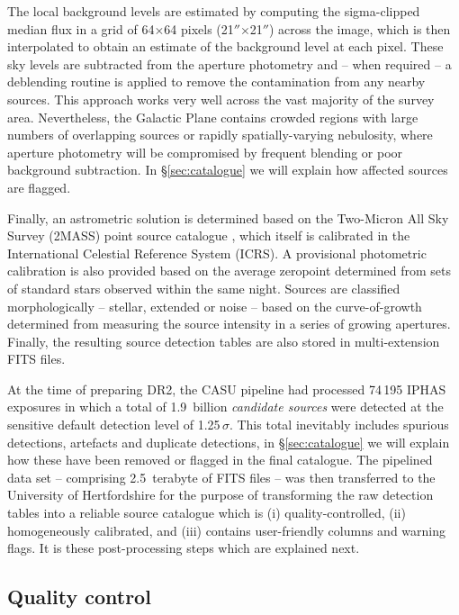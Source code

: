 \documentclass[useAMS,usenatbib]{mn2e}
\def\arcsec{$''$}
\begin{document}
The local background levels are estimated 
by computing the sigma-clipped median
flux in a grid of 64$\times$64 pixels (21\arcsec$\times$21\arcsec)
across the image,
which is then interpolated to obtain an estimate 
of the background level at each pixel.
These sky levels are subtracted from the aperture photometry and
-- when required --
a deblending routine is applied to remove
the contamination from any nearby sources.
This approach works very well 
across the vast majority of the survey area.  Nevertheless,
the Galactic Plane contains crowded regions 
with large numbers of overlapping sources
or rapidly spatially-varying nebulosity,
where aperture photometry will be compromised by frequent blending
or poor background subtraction.
In \S\ref{sec:catalogue} we will explain how affected sources are 
flagged. 

Finally, an astrometric solution is determined
based on the Two-Micron All Sky Survey (2MASS) point source catalogue \citep{Skrutskie2006},
which itself is calibrated 
in the International Celestial Reference System (ICRS).
A provisional photometric calibration is also provided 
based on the average zeropoint
determined from sets of standard stars observed within the same night.
Sources are classified morphologically
-- stellar, extended or noise --
based on the curve-of-growth determined
from measuring the source intensity in a series of growing apertures.
Finally, the resulting source detection tables are also stored 
in multi-extension FITS files.

At the time of preparing DR2,
the CASU pipeline had processed
74\,195 IPHAS exposures 
in which a total of 1.9~billion \emph{candidate sources} were detected 
at the sensitive default detection level of 1.25\,$\sigma$.
This total inevitably includes spurious detections, artefacts and
duplicate detections,
in \S\ref{sec:catalogue} we will explain
how these have been removed or flagged in the final catalogue.
The pipelined data set -- comprising 2.5~terabyte of FITS files --
was then transferred to the University of Hertfordshire
for the purpose of transforming the raw
detection tables into a reliable source catalogue which is 
(i) quality-controlled,
(ii) homogeneously calibrated, and 
(iii) contains user-friendly columns and warning flags.
It is these post-processing steps which are explained next.


\subsection{Quality control}
\label{sec:qc}
\end{document}
